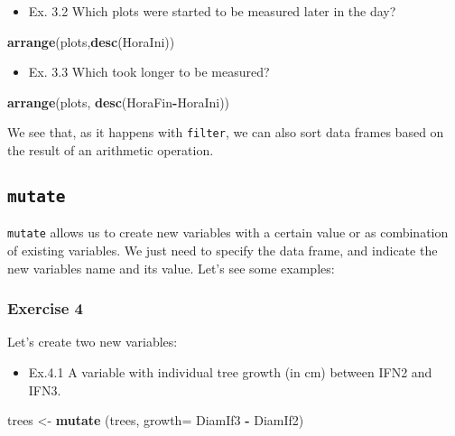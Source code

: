 \documentclass[]{article}
\newenvironment{Shaded}{\begin{snugshade}}{\end{snugshade}}
\newcommand{\KeywordTok}[1]{\textcolor[rgb]{0.13,0.29,0.53}{\textbf{#1}}}
\newcommand{\DataTypeTok}[1]{\textcolor[rgb]{0.13,0.29,0.53}{#1}}
\newcommand{\StringTok}[1]{\textcolor[rgb]{0.31,0.60,0.02}{#1}}
\newcommand{\OperatorTok}[1]{\textcolor[rgb]{0.81,0.36,0.00}{\textbf{#1}}}
\newcommand{\NormalTok}[1]{#1}
\providecommand{\tightlist}{%
  \setlength{\itemsep}{0pt}\setlength{\parskip}{0pt}}
\begin{document}
\begin{itemize}
\tightlist
\item
  Ex. 3.2 Which plots were started to be measured later in the day?
\end{itemize}

\begin{Shaded}
\begin{Highlighting}[]
\KeywordTok{arrange}\NormalTok{(plots,}\KeywordTok{desc}\NormalTok{(HoraIni))}
\end{Highlighting}
\end{Shaded}

\begin{itemize}
\tightlist
\item
  Ex. 3.3 Which took longer to be measured?
\end{itemize}

\begin{Shaded}
\begin{Highlighting}[]
\KeywordTok{arrange}\NormalTok{(plots, }\KeywordTok{desc}\NormalTok{(HoraFin}\OperatorTok{-}\NormalTok{HoraIni))}
\end{Highlighting}
\end{Shaded}

We see that, as it happens with \texttt{filter}, we can also sort data
frames based on the result of an arithmetic operation.

\subsection{\texorpdfstring{\texttt{mutate}}{mutate}}\label{mutate}

\texttt{mutate} allows us to create new variables with a certain value
or as combination of existing variables. We just need to specify the
data frame, and indicate the new variables name and its value. Let's see
some examples:

\subsubsection{Exercise 4}\label{exercise-4}

Let's create two new variables:

\begin{itemize}
\tightlist
\item
  Ex.4.1 A variable with individual tree growth (in cm) between IFN2 and
  IFN3.
\end{itemize}

\begin{Shaded}
\begin{Highlighting}[]
\NormalTok{trees <-}\StringTok{ }\KeywordTok{mutate}\NormalTok{ (trees, }\DataTypeTok{growth=}\NormalTok{ DiamIf3 }\OperatorTok{-}\StringTok{ }\NormalTok{DiamIf2)}
\end{Highlighting}
\end{Shaded}
\end{document}
